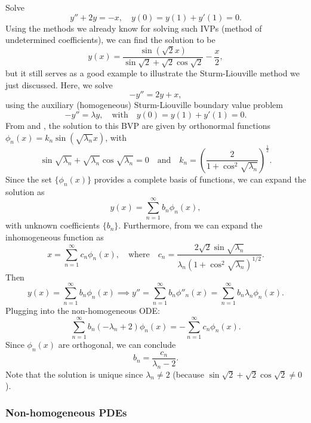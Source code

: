 \begin{eg}
	Solve
	\[
		y'' + 2y = -x, \quad y(0) = y(1) + y'(1) = 0.
	\]
	Using the methods we already know for solving such IVPs (method of undetermined coefficients), we can find the solution to be
	\[
		y(x) = \frac{\sin(\sqrt{2}x)}{\sin\sqrt{2} + \sqrt{2}\cos\sqrt{2}} - \frac{x}{2},
	\]
	but it still serves as a good example to illustrate the Sturm-Liouville method we just discussed. Here, we solve
	\[
		-y'' = 2y + x,
	\]
	using the auxiliary (homogeneous) Sturm-Liouville boundary value problem
	\[
		-y'' = \lambda y, \quad\text{with}\quad y(0) = y(1) + y'(1) = 0.
	\]
	From  and , the solution to this BVP are given by orthonormal functions $\phi_n(x) = k_n \sin(\sqrt{\lambda_n}x)$, with
	\[
		\sin\sqrt{\lambda_n} + \sqrt{\lambda_n}\cos\sqrt{\lambda_n} = 0 \quad\text{and}\quad k_n = \left(\frac{2}{1 + \cos^2\sqrt{\lambda_n}}\right)^{\frac12}.
	\]
	Since the set $\{\phi_n(x)\}$ provides a complete basis of functions, we can expand the solution as
	\[
		y(x) = \sum_{n=1}^{\infty} b_n \phi_n(x),
	\]
	with unknown coefficients $\{b_n\}$. Furthermore, from  we can expand the inhomogeneous function as
	\[
		x = \sum_{n=1}^{\infty} c_n \phi_n(x), \quad\text{where}\quad c_n = \frac{2\sqrt{2} \sin\sqrt{\lambda_n}}{\lambda_n (1 + \cos^2\sqrt{\lambda_n})^{1/2}}.
	\]
	Then
	\[
		y(x) = \sum_{n=1}^{\infty} b_n \phi_n(x) \implies y'' = \sum_{n=1}^{\infty} b_n \phi''_n(x) = \sum_{n=1}^{\infty} b_n\lambda_n\phi_n(x).
	\]
	Plugging into the non-homogeneous ODE:
	\[
		\sum_{n=1}^{\infty} b_n(-\lambda_n + 2)\phi_n(x) = -\sum_{n=1}^{\infty} c_n \phi_n(x).
	\]
	Since $\phi_n(x)$ are orthogonal, we can conclude
	\[
		b_n = \frac{c_n}{\lambda_n - 2}.
	\]
	Note that the solution is unique since $\lambda_n \neq 2$ (because $\sin\sqrt{2} + \sqrt{2}\cos\sqrt{2} \neq 0$).
\end{eg}


\subsubsection{Non-homogeneous PDEs}

